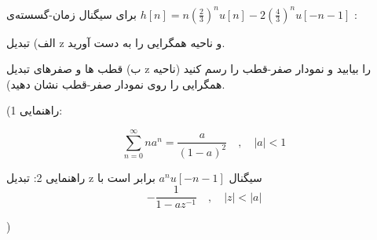 \documentclass{article}
\begin{document}
%

\large

برای سیگنال زمان-گسسته‌ی 
$
h[n]=n\left(\frac{2}{3}\right)^nu[n]
-
2\left(\frac{4}{3}\right)^nu[-n-1]
$
:

الف) تبدیل z و ناحیه همگرایی را به دست آورید.

ب) قطب ها و صفرهای تبدیل z را بیابید و نمودار صفر-قطب را رسم کنید (ناحیه همگرایی را روی نمودار صفر-قطب نشان دهید).

(راهنمایی 1:

$$
\sum_{n=0}^\infty na^n=\frac{a}{(1-a)^2} \quad,\quad |a|<1
$$

راهنمایی 2: تبدیل z سیگنال 
$
a^nu[-n-1]
$
برابر است با
$$
-\frac{1}{1-az^{-1}}\quad,\quad |z|<|a|
$$

)
\end{document}
